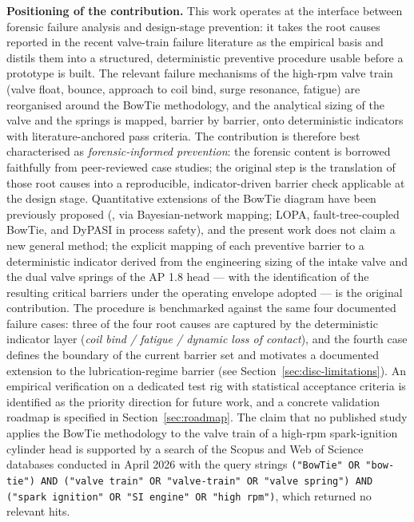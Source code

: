\noindent\textbf{Positioning of the contribution.} This work
operates at the interface between forensic failure analysis and
design-stage prevention: it takes the root causes reported in the
recent valve-train failure literature
\citep{velezgodino2019overheadvalvetrain,soffritti2018wornvalvetrain,xing2021valvespringEAC,zhao2023camshaftV6}
as the empirical basis and distils them into a structured,
deterministic preventive procedure usable before a prototype is
built. The relevant failure mechanisms of the high-rpm valve train
(valve float, bounce, approach to coil bind, surge resonance,
fatigue) are reorganised around the BowTie methodology, and the
analytical sizing of the valve and the springs is mapped, barrier
by barrier, onto deterministic indicators with literature-anchored
pass criteria. The contribution is therefore best characterised as
\emph{forensic-informed prevention}: the forensic content is borrowed
faithfully from peer-reviewed case studies; the original step is the
translation of those root causes into a reproducible,
indicator-driven barrier check applicable at the design stage.
Quantitative extensions of the BowTie diagram have been previously
proposed (\citealp{khakzad2013bowtiebayesian}, via Bayesian-network
mapping; LOPA, fault-tree-coupled BowTie, and DyPASI in process
safety), and the present work does not claim a new general method;
the explicit mapping of each preventive barrier to a deterministic
indicator derived from the engineering sizing of the intake valve
and the dual valve springs of the AP 1.8 head --- with the
identification of the resulting critical barriers under the operating
envelope adopted --- is the original contribution. The procedure is
benchmarked against the same four documented failure cases:
three of the four root causes are captured by the deterministic
indicator layer (\textit{coil bind / fatigue / dynamic loss of
contact}), and the fourth case \citep{zhao2023camshaftV6} defines
the boundary of the current barrier set and motivates a documented
extension to the lubrication-regime barrier (see
Section~\ref{sec:disc-limitations}). An empirical verification on a
dedicated test rig with statistical acceptance criteria is
identified as the priority direction for future work, and a concrete
validation roadmap is specified in Section~\ref{sec:roadmap}. The
claim that no published study applies the BowTie methodology to the
valve train of a high-rpm spark-ignition cylinder head is supported
by a search of the Scopus and Web of Science databases conducted in
April 2026 with the query strings
\texttt{("BowTie" OR "bow-tie") AND ("valve train" OR "valve-train" OR "valve spring") AND ("spark ignition" OR "SI engine" OR "high rpm")},
which returned no relevant hits.

